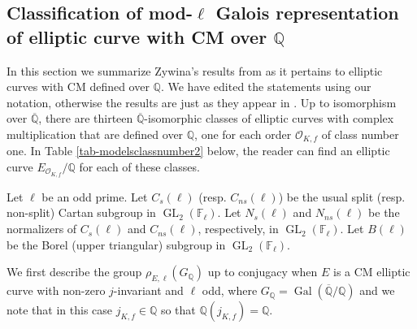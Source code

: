 \documentclass[11pt]{amsart}
\theoremstyle{definition}
\newcommand{\Q}{\mathbb Q}
\newcommand{\QQ}{\mathbb Q}
\newcommand{\FF}{\mathbb F}
\newcommand{\Qbar}{\overline{\mathbb{Q}}}
\newcommand{\Of}{\mathcal{O}_{K,f}}
\newcommand{\Gal}{\operatorname{Gal}}
\newcommand{\GL}{\operatorname{GL}}
\begin{document}
\subsection{Classification of mod-$\ell$ Galois representation of elliptic curve with CM over $\QQ$}
\label{sec-zywinasresults}
In this section we summarize Zywina's results from \cite{zywina} as it pertains to elliptic curves with CM defined over $\Q$. We have edited the statements using our notation, otherwise the results are just as they appear in \cite{zywina}. Up to isomorphism over $\Qbar$, there are thirteen $\Qbar$-isomorphic classes of elliptic curves with complex multiplication that are defined over $\QQ$, one for each order $\Of$ of class number one.  In Table \ref{tab-modelsclassnumber2} below, the reader can find an elliptic curve $E_{\Of}/\QQ$ for each of these classes. 

Let  $\ell$ be an odd prime. Let  $C_s(\ell)$ (resp. $C_{ns}(\ell)$) be the usual split (resp. non-split) Cartan subgroup in $\GL_2(\FF_\ell)$. Let $N_s(\ell)$ and $N_{ns}(\ell)$ be the normalizers of $C_{s}(\ell)$ and $C_{ns}(\ell)$, respectively, in $\GL_2(\FF_\ell)$.   Let $B(\ell)$ be the Borel (upper triangular) subgroup in $\GL_2(\FF_\ell)$.

We first describe the group $\rho_{E,\ell}(G_\Q)$ up to conjugacy when $E$ is a CM elliptic curve with non-zero $j$-invariant and $\ell$ odd, where $G_\Q=\Gal(\overline{\Q}/\Q)$ and we note that in this case $j_{K,f}\in \Q$ so that $\Q(j_{K,f})=\Q$.
\end{document}
